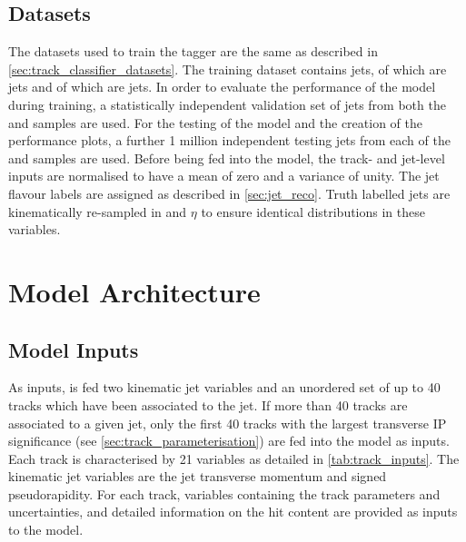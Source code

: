 \subsection{Datasets}\label{sec:datasets}

The datasets used to train the \GNN tagger are the same as described in \cref{sec:track_classifier_datasets}.
The training dataset contains \njetstrain jets,  of which are \ttbar jets and  of which are \Zprime jets.
In order to evaluate the performance of the model during training, a statistically independent validation set of \njetsval jets from both the \ttbar and \Zprime samples are used.
For the testing of the model and the creation of the performance plots, a further 1 million independent testing jets from each of the \ttbar and \Zprime samples are used.
Before being fed into the model, the track- and jet-level inputs are normalised to have a mean of zero and a variance of unity. 
The jet flavour labels are assigned as described in \cref{sec:jet_reco}.
Truth labelled \bcl jets are kinematically re-sampled in \pt and $\eta$ to ensure identical distributions in these variables.


\section{Model Architecture}\label{sec:networks}

\subsection{Model Inputs}\label{sec:model-inputs}

\newcommand{\ipdefsfootnote}{%
Impact parameter significances are defined as the IP divided by its corresponding uncertainty, $\dzerosig = d_0 / \dzerouncert$ and $\zzerosig = z_0 / \zzerouncert$.
Track IP significances are lifetime signed according to the track's direction with respect to the jet axis and the primary vertex \cite{PERF-2012-04}.
}

As inputs, \GNN is fed two kinematic jet variables and an unordered set of up to 40 tracks which have been associated to the jet.
If more than 40 tracks are associated to a given jet, only the first 40 tracks with the largest transverse IP significance \dzerosig (see \cref{sec:track_parameterisation}) are fed into the model as inputs.
Each track is characterised by 21 variables as detailed in \cref{tab:track_inputs}.
The kinematic jet variables are the jet transverse momentum and signed pseudorapidity.
For each track, variables containing the track parameters and uncertainties, and detailed information on the hit content are provided as inputs to the model.

